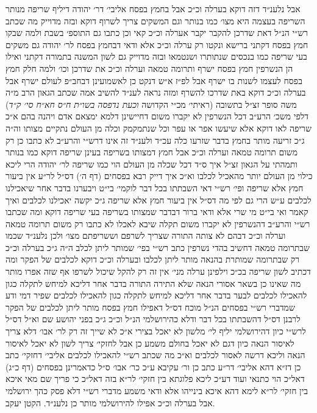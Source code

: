 \documentclass[12pt, openany]{book}
\begin{document}
\begin{multicols}{2}
אבל נלענ״ד דזה דוקא בערלה וכ״כ אבל בחמץ בפסח אליבי׳ דר׳ יהודה דיליף שריפה מנותר השריפה בעצמה היא מצו׳ כמו בנותר וגם המשקים צריך לשרוף דוקא ובזה מדוייק מה שכתב רש״י הנ״ל דאת שדרכן להקבר יקבר אערלה וכ״כ קאי וכן כתבו גם התוספ׳ בשבת ולמה שבקו חמץ בפסח דקתני ברישא ונקטו רק ערלה וכ״כ אלא ודאי דבחמץ בפסח לר׳ יהודה גם משקים בעי שריפה כמו בנכסים שנתותרו ושנטמאו ובזה מדוייק גם לשון המשנה בתמורה דקתני ואילו הן הנשרפין חמץ בפסח ישרף ותרומה טמאה וערלה וכ״כ את שדרכן וכו׳ ולמה חלק חמץ בפסח לעצמו לשנות בו ישרף אבל לפ״ז א״ש דנקט כן לאשמועינן דבחב״פ לעולם ישרף אבל בערלה וכ״כ דוקא באת שדרכו להשרף ומזה נראה לענ״ד להשיב אמה שכתב הגאון הרב מ״ה משה סופר זצ״ל בתשובה (ראיתי׳ מכ״י הקדושה \textit{וכעת נדפסה בשו״ת ח״ס חא״ח סי׳ ק״ד}) דלפי משכ׳ הרע״ב דכל הנשרפין לא יקברו משום דחיישינן דלמא ימצאם אדם ויהנה בהם א״כ שריפה לאו דוקא אלא שיעשו אפר או עפר וכל שנתמקמק וכלה מן העולם נתקיים מצותו וה״ה ג״כ זריעה מותר בחמץ בדבר שזרעו כלה עכ״ד ולענ״ד זה אינו דרש״י והרע״ב לא כתבו כן רק משום תרומה טמאה וערלה וכ״כ אבל חמץ דמצותו בשריפה בעינן שריפה דוקא כמו בנותר ותמהתי על הגאון זצ״ל איך ס״ד דכל שכלה מן העולם הוי כמו שריפה לר׳ יהודה הרי ליכא כילוי מן העולם יותר מהאכיל לכלבו וא״כ איך דייק רבא בפסחים (דף ה׳) דס״ל לר״ע אין ביעור חמץ אלא שריפה ופי׳ רש״י דאי השבתתו בכל דבר לוקמי׳ בי״ט ויבערנו בדבר אחר שיאכילנו לכלבים ע״ש הרי גם לפי מה דס״ל אין ביעור חמץ אלא שריפה ג״כ יקשה יאכילנו לכלבים ואיך קאמר ואי בי״ט מי שרי אלא ודאי ברור דבדבר שמצותו בשריפה בעי שריפה דוקא ומה שכתבו רש״י והרע״ב דהנשרפין לא יקברו משום תקלה שיבא לאכלו לא כתבו רק משום תרומה טמאה וערלה וכ״כ דבהם לא צותה התורה שצריך לשרפם וששריפתם מצו׳ ולכן נלענ״ד שכמו שבתרומה טמאה דחשיב בהדי נשרפין כתב רש״י בפי׳ שמותר ליתן לכלב ה״ה ג״כ בערלה וכ״כ רק שבתרומה שמותרת בהנאה מותר ליתן לכלבו ובערלה וכ״כ דוקא לכלבים של הפקר ומה דכתיב לשון שריפה בכ״כ וילפינן ערלה מני׳ אין זה רק להקל שיכול לשרפו אף שזה אפרו מותר מה שאינו כן בשאר אסורי הנאה שלא התירה התורה בדבר אחר דליכא למיחש לתקלה כגון להאכילו לכלבים לבער בדבר אחר דליכא למיחש לתקלה כגון להאכילו לכלבים שפיר דמי ודע שמדברי רש״י בפסחים הנ״ל מוכח דס״ל דאפילו חמץ בפסח מותר ליתן לכלבים של הפקר לרבנן דס״ל דהשבתתו בכל דבר ודלא כהירושלמי הנ״ל וכ״כ ג״כ בפני יהושע שם וא״ל דס״ל לרש״י כיון דהירושלמי יליף לי׳ מלשון לא יאכל בצירי א״כ לא שייך זה רק לר׳ אבו׳ דלא צריך לאיסור הנאה כיון דגם לא יאכל בחולם משמע כן אבל לחזקי׳ צריך לשון לא יאכל לאיסור הנאה וליכא דרשה לאסור לכלבים וא״כ מה שכתב רש״י להאכילו לכלבים אליבי׳ דחזקי׳ כתב כן דז״א דהא אליבי׳ דר״ע כתב כן ור׳ עקיבא ע״כ כר׳ אבו׳ ס״ל כדאמרינן בפסחים (דף כ״ג) דאל״כ הוי כתנאי ועוד דע״כ ליכא פלוגתא בין חזקי׳ לר״א בזה דאל״כ כי פריך שם מאי איכא בין חזקי׳ לר״א לימא דהא איכא בינייהו אלא ודאי משמע מדברי רש״י דלא פסק כהך ירושלמי אבל בערלה וכ״כ אפילו להירושלמי מותר כן נלענ״ד. הקטן יעקב.\\\vspace{0pt}

\end{multicols}\newpage
\end{document}
